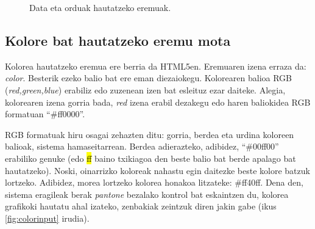  
 \begin{figure}[ht]
	\centering
{}
\caption{Data eta orduak hautatzeko eremuak.}
\label{fig:datakorduak}
\end{figure}

\subsection{Kolore bat hautatzeko eremu mota}
Kolorea hautatzeko eremua ere berria da HTML5en. Eremuaren izena erraza da: \textit{color}. Besterik ezeko balio bat ere eman diezaiokegu. Kolorearen balioa RGB (\textit{red,green,blue}) erabiliz edo zuzenean izen bat esleituz ezar daiteke. Alegia, kolorearen izena gorria bada, \textit{red} izena erabil dezakegu edo haren baliokidea RGB formatuan ``\#ff0000''. 

RGB formatuak hiru osagai zehazten ditu: gorria, berdea eta urdina koloreen balioak, sistema hamaseitarrean. Berdea adierazteko, adibidez, ``\#00ff00'' erabiliko genuke (edo \hl{ff} baino txikiagoa den beste balio bat berde apalago bat hautatzeko). Noski, oinarrizko koloreak nahastu egin daitezke beste kolore batzuk lortzeko. Adibidez, morea lortzeko kolorea honakoa litzateke: \#ff40ff. Dena den, sistema eragileak berak  \textit{pantone} bezalako kontrol bat eskaintzen du, kolorea grafikoki hautatu ahal izateko, zenbakiak zeintzuk diren jakin gabe (ikus \ref{fig:colorinput} irudia).

